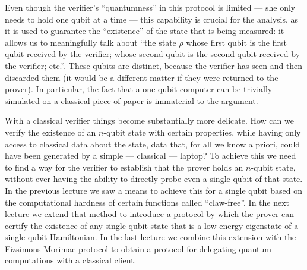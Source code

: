 Even though the verifier's ``quantumness'' in this protocol is limited --- she only needs to hold one qubit at a time --- this capability is crucial for the analysis, as it is used to guarantee the ``existence'' of the state that is being measured: it allows us to meaningfully talk about ``the state $\rho$ whose first qubit is the first qubit received by the verifier; whose second qubit is the second qubit received by the verifier; etc.''. These qubits are distinct, because the verifier has seen and then discarded them (it would be a different matter if they were returned to the prover). In particular, the fact that a one-qubit computer can be trivially simulated on a classical piece of paper is immaterial to the argument.

With a classical verifier things become substantially more delicate. How can we verify the existence of an $n$-qubit state with certain properties, while having only access to classical data about the state, data that, for all we know a priori, could have been generated by a simple --- classical --- laptop? To achieve this we need to find a way for the verifier to establish that the prover holds an $n$-qubit state, without ever having the ability to directly probe even a single qubit of that state. In the previous lecture we saw a means to achieve this for a single qubit based on the computational hardness of certain functions called ``claw-free''. In the next lecture we extend that method to introduce a protocol by which the prover can certify the existence of any single-qubit state that is a low-energy eigenstate of a single-qubit Hamiltonian. In the last lecture we combine this extension with the Fizsimons-Morimae protocol to obtain a protocol for delegating quantum computations with a classical client. 

